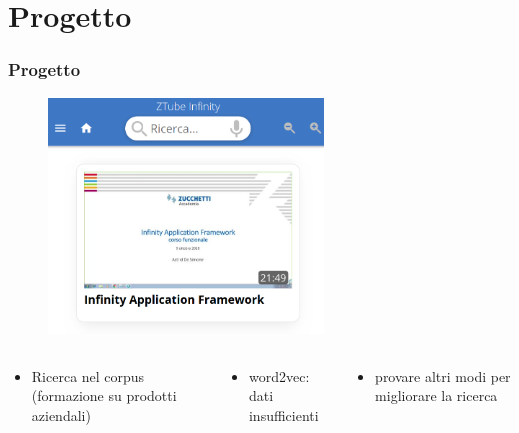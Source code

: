 \documentclass{beamer}
\begin{document}
	\section{Progetto}
	\begin{frame}
		\frametitle{Progetto}
		\begin{figure}
			\vspace{-2em}
			\centering
			\includegraphics[width=0.65\textwidth]{img/ztube.png}
		\end{figure}
		\vspace{-2em}
		\begin{columns}[T]
			\begin{column}{0.4\textwidth}
				\begin{itemize}
					\item Ricerca nel corpus (formazione su prodotti aziendali)
				\end{itemize}
			\end{column}
			\begin{column}{0.33\textwidth}
				\centering
				\begin{itemize}
					\item word2vec: dati insufficienti
				\end{itemize}
			\end{column}
			\begin{column}{0.50\textwidth}
				\centering
				\begin{itemize}
					\item provare altri modi per migliorare la ricerca 
				\end{itemize}
			\end{column}
		\end{columns}
	\end{frame}
\end{document}
